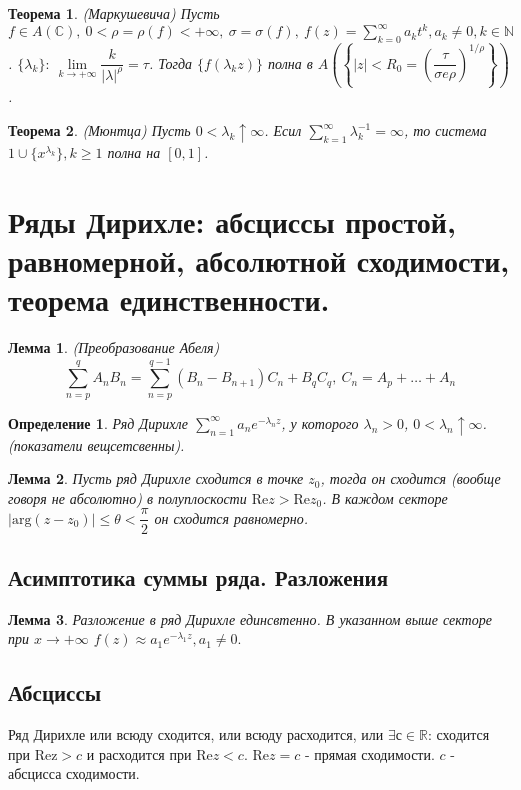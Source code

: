 \documentclass[9pt]{article}
\newtheorem{theorem}{Теорема} %
\newtheorem{lemma}{Лемма} %
\newtheorem{definition}{Определение}
\begin{document}
		\begin{theorem}(Маркушевича)\newline
			Пусть $f \in A(\mathbb{C}), \ 0 < \rho = \rho (f) < + \infty, \ \sigma = \sigma(f), \ f(z) = \sum\limits_{k=0}^{\infty} a_kt^k, a_k \neq 0, k\in \mathbb{N}$. $\{\lambda_k\}: \ \lim\limits_{k\to+\infty} \dfrac{k}{|\lambda|^\rho} = \tau$. Тогда $\{f(\lambda_k z)\}$ полна в $A\left(\left\{|z| < R_0 = \left(\dfrac{\tau}{\sigma e \rho}\right)^{1/\rho}\right\}\right)$.
		\end{theorem}
		\begin{theorem}(Мюнтца)\newline
			Пусть $0 < \lambda_k \uparrow \infty$. Есил $\sum\limits_{k=1}^{\infty} \lambda_k^{-1} = \infty$, то система $1 \cup \{x^{\lambda_k}\}, k \geq 1$ полна на $[0,1]$.		
		\end{theorem}
		
		
		\section{Ряды Дирихле: абсциссы простой, равномерной, абсолютной сходимости, теорема единственности.}
			\begin{lemma}(Преобразование Абеля)
				$$
				\sum\limits_{n=p}^{q} A_nB_n = \sum\limits_{n=p}^{q-1} (B_n - B_{n+1})C_n + B_q C_q, \ C_n = A_p + \dots + A_n
				$$
			\end{lemma}
			\begin{definition}
				Ряд Дирихле $\sum\limits_{n=1}^{\infty} a_n e^{-\lambda_n z}$, у которого $\lambda_n > 0$, $0 < \lambda_n \uparrow \infty$. (показатели вещсетсвенны).
			\end{definition}
			\begin{lemma}
				Пусть ряд Дирихле сходится в точке $z_0$, тогда он сходится (вообще говоря не абсолютно) в полуплоскости $\mathrm{Re}z > \mathrm{Re}z_0$. В каждом секторе $|\mathrm{arg}(z - z_0)| \leq \theta < \dfrac\pi2$  он сходится равномерно.
			\end{lemma}
			\subsection{Асимптотика суммы ряда. Разложения}
				\begin{lemma}
					Разложение в ряд Дирихле единсвтенно. В указанном выше секторе при $ x \to +\infty$ $f(z) \approx a_1 e^{-\lambda_1 z}, a_1 \neq 0.$
				\end{lemma}
			\subsection{ Абсциссы}
				Ряд Дирихле или всюду сходится, или всюду расходится, или $\exists с \in \mathbb{R}$: сходится при $\mathrm{Re z} > c$ и расходится при $\mathrm{Re}z < c$. $\mathrm{Re}z = c$ - прямая сходимости. $c$ - абсцисса сходимости.
				
\end{document}
